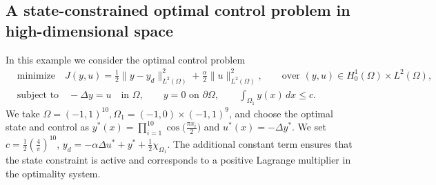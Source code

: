 \documentclass{article}
\numberwithin{equation}{section}
\begin{document}
\subsection{A state-constrained optimal control problem in high-dimensional space}
\label{subsec:4D}

In this example we consider the optimal control problem
\begin{align*}
&\text{minimize}\quad J(y,u)
=
\frac{1}{2}\|y-y_d\|^2_{L^2(\Omega)}
+
\frac{\alpha}{2}\|u\|^2_{L^2(\Omega)},
\qquad \text{over }
(y,u)\in H^1_0(\Omega)\times L^2(\Omega),\\
&\text{subject to}\quad -\Delta y = u \quad \text{in }\Omega,
\qquad
y=0 \text{ on }\partial\Omega,
\qquad
\int_{\Omega_1} y(x)\,dx \le c .
\end{align*}
We take $\Omega=(-1,1)^{10}, \Omega_1 = (-1,0)\times(-1,1)^9$, and choose the optimal state and control as $y^*(x)
=
\prod_{i=1}^{10} \cos\big(\frac{\pi x_i}{2}\big)$ and $u^*(x)=-\Delta y^*$. We set $c=\frac{1}{2}\left(\frac{4}{\pi}\right)^{10}$, $y_d=-\alpha \Delta u^*+y^*+\frac{1}{2}\chi_{\Omega_1}$. The additional constant term ensures that the state constraint is active and corresponds to a positive Lagrange multiplier in the optimality system.
\end{document}
